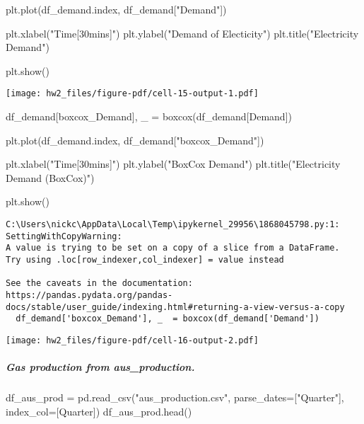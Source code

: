 \documentclass[
  11pt,
]{article}
\let\oldsubparagraph\subparagraph
\renewcommand{\subparagraph}[1]{\oldsubparagraph{#1}\mbox{}}
\newenvironment{Shaded}{\begin{snugshade}}{\end{snugshade}}
\newcommand{\NormalTok}[1]{\textcolor[rgb]{0.00,0.23,0.31}{#1}}
\newcommand{\OperatorTok}[1]{\textcolor[rgb]{0.37,0.37,0.37}{#1}}
\newcommand{\StringTok}[1]{\textcolor[rgb]{0.13,0.47,0.30}{#1}}
\begin{document}
\begin{Shaded}
\begin{Highlighting}[]
\NormalTok{plt.plot(df\_demand.index, df\_demand[}\StringTok{"Demand"}\NormalTok{])}

\NormalTok{plt.xlabel(}\StringTok{"Time[30mins]"}\NormalTok{)}
\NormalTok{plt.ylabel(}\StringTok{"Demand of Electicity"}\NormalTok{)}
\NormalTok{plt.title(}\StringTok{"Electricity Demand"}\NormalTok{)}

\NormalTok{plt.show()}
\end{Highlighting}
\end{Shaded}

\texttt{[image: hw2\_files/figure-pdf/cell-15-output-1.pdf]}

\begin{Shaded}
\begin{Highlighting}[]
\NormalTok{df\_demand[}\StringTok{\textquotesingle{}boxcox\_Demand\textquotesingle{}}\NormalTok{], \_  }\OperatorTok{=}\NormalTok{ boxcox(df\_demand[}\StringTok{\textquotesingle{}Demand\textquotesingle{}}\NormalTok{])}

\NormalTok{plt.plot(df\_demand.index, df\_demand[}\StringTok{"boxcox\_Demand"}\NormalTok{])}

\NormalTok{plt.xlabel(}\StringTok{"Time[30mins]"}\NormalTok{)}
\NormalTok{plt.ylabel(}\StringTok{"BoxCox Demand"}\NormalTok{)}
\NormalTok{plt.title(}\StringTok{"Electricity Demand (BoxCox)"}\NormalTok{)}

\NormalTok{plt.show()}
\end{Highlighting}
\end{Shaded}

\begin{verbatim}
C:\Users\nickc\AppData\Local\Temp\ipykernel_29956\1868045798.py:1: SettingWithCopyWarning: 
A value is trying to be set on a copy of a slice from a DataFrame.
Try using .loc[row_indexer,col_indexer] = value instead

See the caveats in the documentation: https://pandas.pydata.org/pandas-docs/stable/user_guide/indexing.html#returning-a-view-versus-a-copy
  df_demand['boxcox_Demand'], _  = boxcox(df_demand['Demand'])
\end{verbatim}

\texttt{[image: hw2\_files/figure-pdf/cell-16-output-2.pdf]}

\subparagraph{Gas production from
aus\_production.}\label{gas-production-from-aus_production.}

\begin{Shaded}
\begin{Highlighting}[]
\NormalTok{df\_aus\_prod }\OperatorTok{=}\NormalTok{ pd.read\_csv(}\StringTok{"aus\_production.csv"}\NormalTok{, parse\_dates}\OperatorTok{=}\NormalTok{[}\StringTok{"Quarter"}\NormalTok{], index\_col}\OperatorTok{=}\NormalTok{[}\StringTok{\textquotesingle{}Quarter\textquotesingle{}}\NormalTok{])}
\NormalTok{df\_aus\_prod.head()}
\end{Highlighting}
\end{Shaded}
\end{document}
